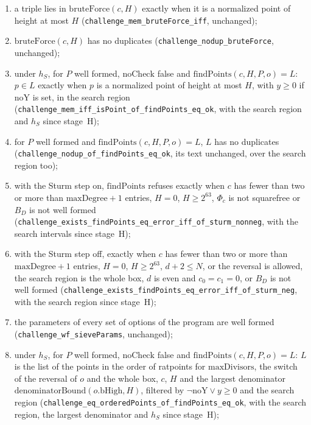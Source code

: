 \begin{enumerate}
  \item a triple lies in $\mathrm{bruteForce}(c, H)$ exactly when it is a normalized point of height
    at most $H$ (\verb|challenge_mem_bruteForce_iff|, unchanged);
  \item $\mathrm{bruteForce}(c, H)$ has no duplicates (\verb|challenge_nodup_bruteForce|,
    unchanged);
  \item under $h_S$, for $P$ well formed, $\mathrm{noCheck}$ false and
    $\mathrm{findPoints}(c, H, P, o) = L$: $p \in L$ exactly when $p$ is a normalized point of
    height at most $H$, with $y \ge 0$ if $\mathrm{noY}$ is set, in the search region
    (\verb|challenge_mem_iff_isPoint_of_findPoints_eq_ok|, with the search region and $h_S$ since
    stage~H);
  \item for $P$ well formed and $\mathrm{findPoints}(c, H, P, o) = L$, $L$ has no duplicates
    (\verb|challenge_nodup_of_findPoints_eq_ok|, its text unchanged, over the search region too);
  \item with the Sturm step on, $\mathrm{findPoints}$ refuses exactly when $c$ has fewer than two or
    more than $\mathrm{maxDegree} + 1$ entries, $H = 0$, $H \ge 2^{63}$, $\Phi_c$ is not squarefree
    or $B_D$ is not well formed (\verb|challenge_exists_findPoints_eq_error_iff_of_sturm_nonneg|,
    with the search intervals since stage~H);
  \item with the Sturm step off, exactly when $c$ has fewer than two or more than
    $\mathrm{maxDegree} + 1$ entries, $H = 0$, $H \ge 2^{63}$, $d + 2 \le N$, or the reversal is
    allowed, the search region is the whole box, $d$ is even and $c_0 = c_1 = 0$, or $B_D$ is not
    well formed (\verb|challenge_exists_findPoints_eq_error_iff_of_sturm_neg|, with the search
    region since stage~H);
  \item the parameters of every set of options of the program are well formed
    (\verb|challenge_wf_sieveParams|, unchanged);
  \item under $h_S$, for $P$ well formed, $\mathrm{noCheck}$ false and
    $\mathrm{findPoints}(c, H, P, o) = L$: $L$ is the list of the points in the order of ratpoints
    for $\mathrm{maxDivisors}$, the switch of the reversal of $o$ and the whole box, $c$, $H$ and
    the largest denominator $\mathrm{denominatorBound}(o.\mathrm{bHigh}, H)$, filtered by
    $\neg\mathrm{noY} \lor y \ge 0$ and the search region
    (\verb|challenge_eq_orderedPoints_of_findPoints_eq_ok|, with the search region, the largest
    denominator and $h_S$ since stage~H);

\end{enumerate}
